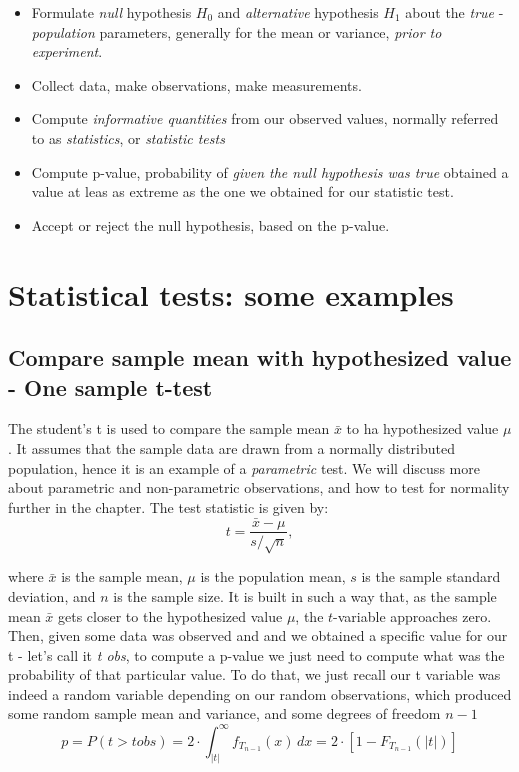\documentclass{book}
\begin{document}
\begin{itemize}
\item Formulate \textit{null} hypothesis $H_0$ and \textit{alternative} hypothesis $H_1$ about the \textit{true} - \textit{population} parameters, generally for the mean or variance, \textit{prior to experiment}.
\item Collect data, make observations, make measurements.
\item Compute \textit{informative quantities} from our observed values, normally referred to as \textit{statistics}, or \textit{statistic tests}
\item Compute p-value, probability of \textit{given the null hypothesis was true} obtained a value at leas as extreme as the one we obtained for our statistic test.
\item Accept or reject the null hypothesis, based on the p-value.
\end{itemize}

\newpage

\section{Statistical tests: some examples}

\subsection{Compare sample mean with hypothesized value - One sample t-test}

The student's t is used to compare the sample mean $\bar{x}$ to ha hypothesized value $\mu$. It assumes that the sample data are drawn from a normally distributed population, hence it is an example of a \textit{parametric} test. We will discuss more about parametric and non-parametric observations, and how to test for normality further in the chapter. The test statistic is given by:
\[
    t = \frac{\bar{x} - \mu}{s / \sqrt{n}},
\]

where $\bar{x}$ is the sample mean, $\mu$ is the population mean, $s$ is the sample standard deviation, and $n$ is the sample size. It is built in such a way that, as the sample mean $\bar{x}$ gets closer to the hypothesized value $\mu$, the $t$-variable approaches zero.\\

Then, given some data was observed and and we obtained a specific value for our t - let's call it \textit{t obs}, to compute a p-value we just need to compute what was the probability of that particular value. To do that, we just recall our t variable was indeed a random variable depending on our random observations, which produced some random sample mean and variance, and some degrees of freedom $n - 1$
\[
p = P\left(t > t obs \right) = 2 \cdot \int_{|t|}^{\infty} f_{T_{n-1}}(x)\,dx = 2 \cdot \left[1 - F_{T_{n-1}}(|t|)\right]
\]
\end{document}
